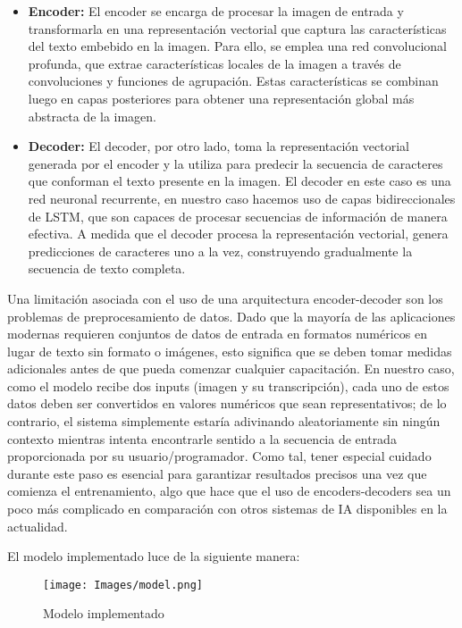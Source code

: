 \documentclass{article}
\begin{document}
\begin{itemize}
    \item \textbf{Encoder: } El encoder se encarga de procesar la imagen de entrada y transformarla en una representación vectorial que captura las características del texto embebido en la imagen. Para ello, se emplea una red convolucional profunda, que extrae características locales de la imagen a través de convoluciones y funciones de agrupación. Estas características se combinan luego en capas posteriores para obtener una representación global más abstracta de la imagen.

    \item \textbf{Decoder: } El decoder, por otro lado, toma la representación vectorial generada por el encoder y la utiliza para predecir la secuencia de caracteres que conforman el texto presente en la imagen. El decoder en este caso es una red neuronal recurrente, en nuestro caso hacemos uso de capas bidireccionales de LSTM, que son capaces de procesar secuencias de información de manera efectiva. A medida que el decoder procesa la representación vectorial, genera predicciones de caracteres uno a la vez, construyendo gradualmente la secuencia de texto completa.


\end{itemize}

Una limitación asociada con el uso de una arquitectura encoder-decoder son los problemas de preprocesamiento de datos. Dado que la mayoría de las aplicaciones modernas requieren conjuntos de datos de entrada en formatos numéricos en lugar de texto sin formato o imágenes, esto significa que se deben tomar medidas adicionales antes de que pueda comenzar cualquier capacitación. En nuestro caso, como el modelo recibe dos inputs (imagen y su transcripción), cada uno de estos datos deben ser convertidos en valores numéricos que sean representativos; de lo contrario, el sistema simplemente estaría adivinando aleatoriamente sin ningún contexto mientras intenta encontrarle sentido a la secuencia de entrada proporcionada por su usuario/programador. Como tal, tener especial cuidado durante este paso es esencial para garantizar resultados precisos una vez que comienza el entrenamiento, algo que hace que el uso de encoders-decoders sea un poco más complicado en comparación con otros sistemas de IA disponibles en la actualidad.

El modelo implementado luce de la siguiente manera:

\begin{figure}[H]
    \centering
    \texttt{[image: Images/model.png]}
    \caption{Modelo implementado}
    \label{fig:enter-label}
\end{figure}
 
\end{document}
